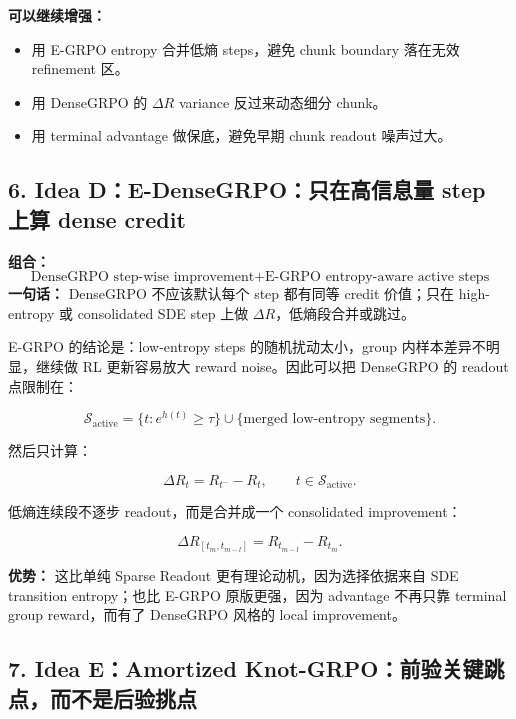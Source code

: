 \textbf{可以继续增强：}

\begin{itemize}[leftmargin=1.5em]
  \item 用 E-GRPO entropy 合并低熵 steps，避免 chunk boundary 落在无效 refinement 区。
  \item 用 DenseGRPO 的 \(\Delta R\) variance 反过来动态细分 chunk。
  \item 用 terminal advantage 做保底，避免早期 chunk readout 噪声过大。
\end{itemize}

\subsection{6. Idea D：E-DenseGRPO：只在高信息量 step 上算 dense credit}

\begin{conceptbox}
\textbf{组合：}
\[
\text{DenseGRPO step-wise improvement}
+ \text{E-GRPO entropy-aware active steps}
\]
\textbf{一句话：} DenseGRPO 不应该默认每个 step 都有同等 credit 价值；只在 high-entropy 或 consolidated SDE step 上做 \(\Delta R\)，低熵段合并或跳过。
\end{conceptbox}

E-GRPO 的结论是：low-entropy steps 的随机扰动太小，group 内样本差异不明显，继续做 RL 更新容易放大 reward noise。因此可以把 DenseGRPO 的 readout 点限制在：

\[
\mathcal{S}_{\mathrm{active}}
=
\{t: e^{h(t)}\ge \tau\}
\cup
\{\text{merged low-entropy segments}\}.
\]

然后只计算：

\[
\Delta R_t=R_{t^-}-R_t,
\qquad t\in \mathcal{S}_{\mathrm{active}}.
\]

低熵连续段不逐步 readout，而是合并成一个 consolidated improvement：

\[
\Delta R_{[t_m,t_{m-l}]}
=R_{t_{m-l}}-R_{t_m}.
\]

\begin{summarybox}
\textbf{优势：} 这比单纯 Sparse Readout 更有理论动机，因为选择依据来自 SDE transition entropy；也比 E-GRPO 原版更强，因为 advantage 不再只靠 terminal group reward，而有了 DenseGRPO 风格的 local improvement。
\end{summarybox}

\subsection{7. Idea E：Amortized Knot-GRPO：前验关键跳点，而不是后验挑点}

